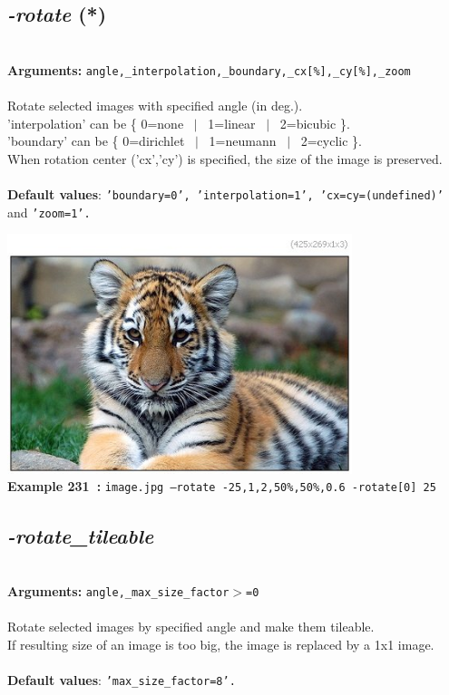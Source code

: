 \documentclass[a4paper,11pt,twoside]{book}
\begin{document}
\subsection{\emph{-rotate} (*)}\vspace*{-0.5em}
~\\\textbf{Arguments: } 
{\small \texttt{angle,\_interpolation,\_boundary,\_cx[\%],\_cy[\%],\_zoom}}\\~\\
Rotate selected images with specified angle (in deg.).
~\\'interpolation' can be \{ 0=none ~$|$~ 1=linear ~$|$~ 2=bicubic \}.
~\\'boundary' can be \{ 0=dirichlet ~$|$~ 1=neumann ~$|$~ 2=cyclic \}.
~\\When rotation center ('cx','cy') is specified, the size of the image is preserved.
~\\~\\\textbf{Default values}: {\small \texttt{'boundary=0', 'interpolation=1', 'cx=cy=(undefined)'} and \texttt{'zoom=1'.}}
\begin{center}\includegraphics[keepaspectratio=true,height=7cm,width=\textwidth]{img/gmic_def231.jpg}\\
{\footnotesize \textbf{Example 231~:} \texttt{image.jpg --rotate -25,1,2,50\%,50\%,0.6 -rotate[0] 25}}
\end{center}

\subsection{\emph{-rotate\_tileable} }\vspace*{-0.5em}
~\\\textbf{Arguments: } 
{\small \texttt{angle,\_max\_size\_factor$>$=0}}\\~\\
Rotate selected images by specified angle and make them tileable.
~\\If resulting size of an image is too big, the image is replaced by a 1x1 image.
~\\~\\\textbf{Default values}: {\small \texttt{'max\_size\_factor=8'.}}
\end{document}
